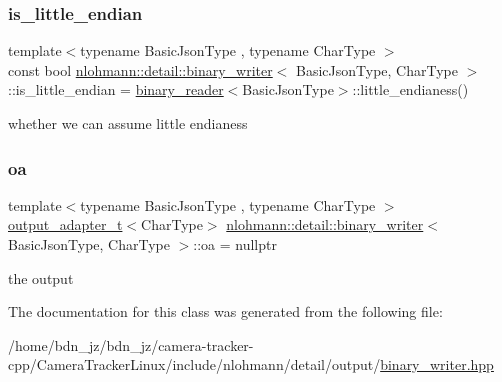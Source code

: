 \subsubsection{\texorpdfstring{is\+\_\+little\+\_\+endian}{is\_little\_endian}}
{\footnotesize\ttfamily template$<$typename Basic\+Json\+Type , typename Char\+Type $>$ \\
const bool \hyperlink{classnlohmann_1_1detail_1_1binary__writer}{nlohmann\+::detail\+::binary\+\_\+writer}$<$ Basic\+Json\+Type, Char\+Type $>$\+::is\+\_\+little\+\_\+endian = \hyperlink{classnlohmann_1_1detail_1_1binary__reader}{binary\+\_\+reader}$<$Basic\+Json\+Type$>$\+::little\+\_\+endianess()\hspace{0.3cm}{\ttfamily [private]}}



whether we can assume little endianess 

\mbox{\label{classnlohmann_1_1detail_1_1binary__writer_a6f15b782a7900f50ef37d123008e601b}} 
\subsubsection{\texorpdfstring{oa}{oa}}
{\footnotesize\ttfamily template$<$typename Basic\+Json\+Type , typename Char\+Type $>$ \\
\hyperlink{namespacenlohmann_1_1detail_a9b680ddfb58f27eb53a67229447fc556}{output\+\_\+adapter\+\_\+t}$<$Char\+Type$>$ \hyperlink{classnlohmann_1_1detail_1_1binary__writer}{nlohmann\+::detail\+::binary\+\_\+writer}$<$ Basic\+Json\+Type, Char\+Type $>$\+::oa = nullptr\hspace{0.3cm}{\ttfamily [private]}}



the output 



The documentation for this class was generated from the following file\+:\begin{DoxyCompactItemize}
\item 
/home/bdn\+\_\+jz/bdn\+\_\+jz/camera-\/tracker-\/cpp/\+Camera\+Tracker\+Linux/include/nlohmann/detail/output/\hyperlink{binary__writer_8hpp}{binary\+\_\+writer.\+hpp}\end{DoxyCompactItemize}
